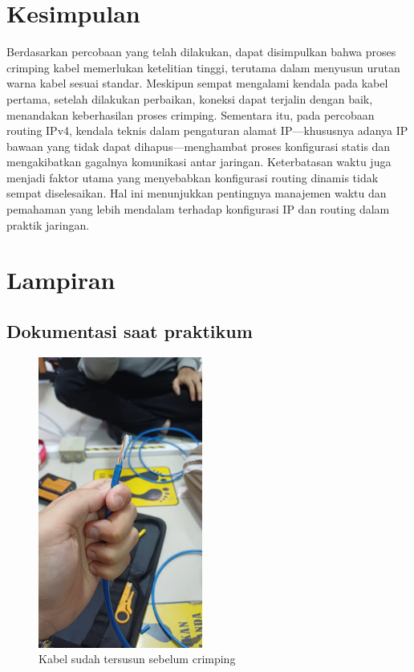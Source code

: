 \section{Kesimpulan}
Berdasarkan percobaan yang telah dilakukan, dapat disimpulkan bahwa proses crimping kabel memerlukan ketelitian tinggi, terutama dalam menyusun urutan warna kabel sesuai standar. Meskipun sempat mengalami kendala pada kabel pertama, setelah dilakukan perbaikan, koneksi dapat terjalin dengan baik, menandakan keberhasilan proses crimping. Sementara itu, pada percobaan routing IPv4, kendala teknis dalam pengaturan alamat IP—khususnya adanya IP bawaan yang tidak dapat dihapus—menghambat proses konfigurasi statis dan mengakibatkan gagalnya komunikasi antar jaringan. Keterbatasan waktu juga menjadi faktor utama yang menyebabkan konfigurasi routing dinamis tidak sempat diselesaikan. Hal ini menunjukkan pentingnya manajemen waktu dan pemahaman yang lebih mendalam terhadap konfigurasi IP dan routing dalam praktik jaringan.

\section{Lampiran}
\subsection{Dokumentasi saat praktikum}
\begin{figure}[H]
    \centering
    \includegraphics[width=0.48\textwidth]{P1/img/kabelsebelumcrimping.jpg}
    \caption{Kabel sudah tersusun sebelum crimping}
    \label{fig:crimping2_lampiran}
\end{figure}

